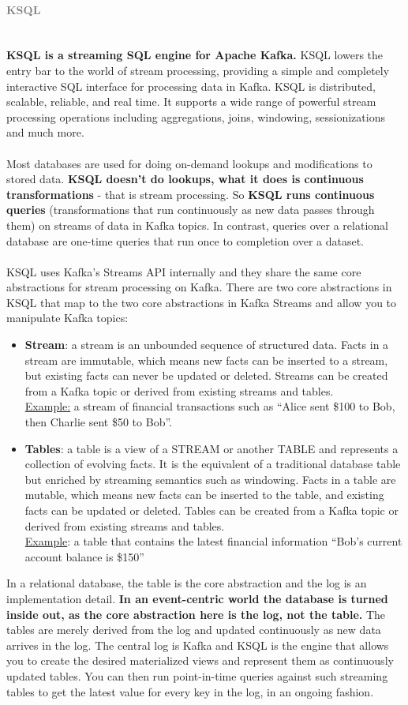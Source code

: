\documentclass[10pt,a4paper]{article}
\newcommand{\nline}{\\~\\}
\newcommand{\myparagraph}[1]{\paragraph{\normalsize{\textcolor{gray}{\uppercase{\textbf{#1}}}} }\mbox{} \vspace{0.5em}\\}
\begin{document}
\myparagraph{KSQL}
\textbf{KSQL is a streaming SQL engine for Apache Kafka.} KSQL lowers the entry bar to the world of stream processing, providing a simple and completely interactive SQL interface for processing data in Kafka. KSQL is distributed, scalable, reliable, and real time. It supports a wide range of powerful stream processing operations including aggregations, joins, windowing, sessionizations and much more.
\nline
Most databases are used for doing on-demand lookups and modifications to stored data. \textbf{KSQL doesn’t do lookups, what it does is continuous transformations} - that is stream processing. So \textbf{KSQL runs continuous queries} (transformations that run continuously as new data passes through them) on streams of data in Kafka topics. In contrast, queries over a relational database are one-time queries that run once to completion over a dataset.
\nline
KSQL uses Kafka’s Streams API internally and they share the same core abstractions for stream processing on Kafka. There are two core abstractions in KSQL that map to the two core abstractions in Kafka Streams and allow you to manipulate Kafka topics:
\begin{itemize}
	\item \textbf{Stream}: a stream is an unbounded sequence of structured data. Facts in a stream are immutable, which means new facts can be inserted to a stream, but existing facts can never be updated or deleted. Streams can be created from a Kafka topic or derived from existing streams and tables. \\
\uline{Example:}
a stream of financial transactions such as “Alice sent \$100 to Bob, then Charlie sent \$50 to Bob”.
	\item \textbf{Tables}: a table is a view of a STREAM or another TABLE and represents a collection of evolving facts. It is the equivalent of a traditional database table but enriched by streaming semantics such as windowing. Facts in a table are mutable, which means new facts can be inserted to the table, and existing facts can be updated or deleted. Tables can be created from a Kafka topic or derived from existing streams and tables. \\
\uline{Example}:
a table that contains the latest financial information “Bob’s current account balance is \$150”
\end{itemize}
In a relational database, the table is the core abstraction and the log is an implementation detail. \textbf{In an event-centric world the database is turned inside out, as the core abstraction here is the log, not the table.} The tables are merely derived from the log and updated continuously as new data arrives in the log. The central log is Kafka and KSQL is the engine that allows you to create the desired materialized views and represent them as continuously updated tables. You can then run point-in-time queries against such streaming tables to get the latest value for every key in the log, in an ongoing fashion.
\end{document}
